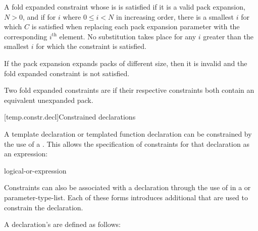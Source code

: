 \pnum
A fold expanded constraint whose  is \tcode{||}
is satisfied if it is a valid pack expansion,
$N > 0$, and if for $i$ where $0 \le i < N$ in increasing order,
there is a smallest $i$ for which $C$ is satisfied
when replacing each pack expansion parameter
with the corresponding $i^\text{th}$ element.
No substitution takes place for any $i$ greater than
the smallest $i$ for which the constraint is satisfied.

\pnum
\begin{note}
If the pack expansion expands packs of different size,
then it is invalid and the fold expanded constraint is not satisfied.
\end{note}

\pnum
Two fold expanded constraints are 
if their respective constraints both contain
an equivalent unexpanded pack.

[temp.constr.decl]{Constrained declarations}

\pnum
A template declaration
or templated function declaration
can be constrained by the use of a .
This allows the specification of constraints for that declaration as
an expression:

\begin{bnf}
\br
    logical-or-expression
\end{bnf}

\pnum
Constraints can also be associated with a declaration through the use of
in a  or parameter-type-list.
Each of these forms introduces additional 
that are used to constrain the declaration.

\pnum
{}%
A declaration's  are defined as follows:

